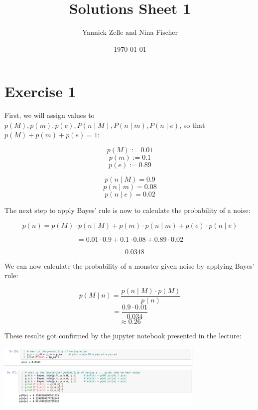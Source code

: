 \documentclass{article}
\title{Solutions Sheet 1}
\author{Yannick Zelle and Nina Fischer}
\date\today
\begin{document}
\maketitle %




\section*{Exercise 1}
 First, we will assign values to $p(M), p(m), p(e), P(n\mid M), P(n\mid m), P(n\mid e)$, so that $p(M) + p(m) + p(e) = 1$:
 
 \[ p(M) := 0.01 \]
 \[ p(m) := 0.1 \]
 \[ p(e) := 0.89 \]
 
 \[ p(n\mid M)=0.9 \]
 \[ p(n\mid m)=0.08 \]
 \[ p(n\mid e)=0.02 \]
 
 The next step to apply Bayes' rule is now to calculate the probability of a noise:
 
 \[p(n)= p(M) \cdot p(n\mid M) + p(m) \cdot p(n\mid m) + p(e) \cdot p(n\mid e)\]
 
 \[ = 0.01 \cdot 0.9 + 0.1 \cdot 0.08 + 0.89 \cdot 0.02\]
 
 \[ = 0.0348\]
 
 We can now calculate the probability of a monster given noise by applying Bayes' rule:
 
 \[ p(M \mid n) =\frac{p(n \mid M) \cdot p(M)}{p(n)}
 \]
 \[=\frac{0.9 \cdot 0.01}{0.034} \]
 \[\approx 0.26\]
 
 These results got confirmed by the jupyter notebook presented in the lecture:
 
\includegraphics[width=10cm, height=1cm]{1}
\newline 
\includegraphics[width=10cm, height=2cm]{2}
\end{document}
